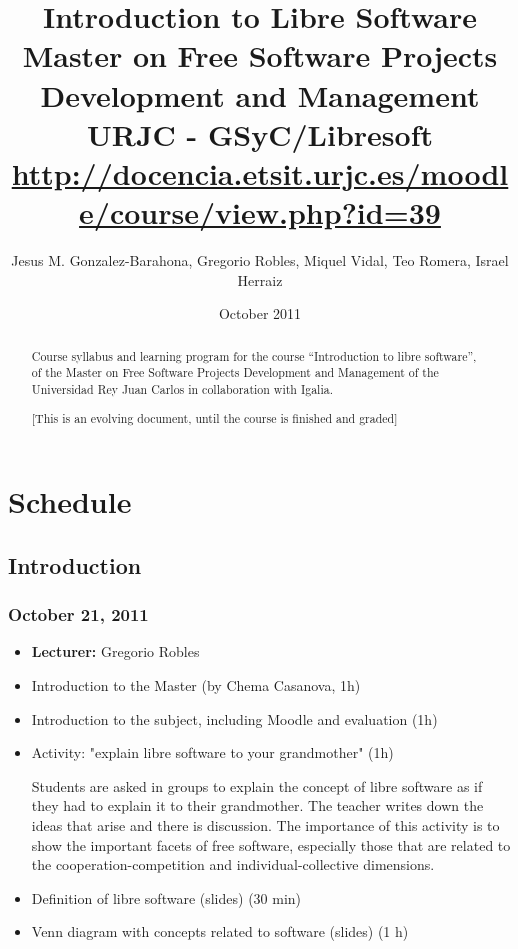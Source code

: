 \documentclass[a4paper]{article}
\title{Introduction to Libre Software\\
Master on Free Software Projects Development and Management \\
URJC - GSyC/Libresoft \\
\url{http://docencia.etsit.urjc.es/moodle/course/view.php?id=39}}
\author{Jesus M. Gonzalez-Barahona, Gregorio Robles, Miquel Vidal, Teo Romera, Israel Herraiz}
\date{October 2011}
\begin{document}
\maketitle

\begin{abstract}
Course syllabus and learning program for the course ``Introduction to libre software'', of the Master on Free Software Projects Development and Management of the Universidad Rey Juan Carlos in collaboration with Igalia.

[This is an evolving document, until the course is finished and graded]
\end{abstract}

\tableofcontents

\section{Schedule}

\subsection{Introduction}

\subsubsection{October 21, 2011}

\begin{itemize}
\item \textbf{Lecturer:} Gregorio Robles
\item Introduction to the Master (by Chema Casanova, 1h)
\item Introduction to the subject, including Moodle and evaluation (1h)
\item Activity: "explain libre software to your grandmother" (1h)

Students are asked in groups to explain the concept of libre software as if
they had to explain it to their grandmother. The teacher writes down the 
ideas that arise and there is discussion. The importance of this activity
is to show the important facets of free software, especially those that are
related to the cooperation-competition and individual-collective dimensions.

\item Definition of libre software (slides) (30 min)

\item Venn diagram with concepts related to software (slides) (1 h)

\end{itemize}
\end{document}
